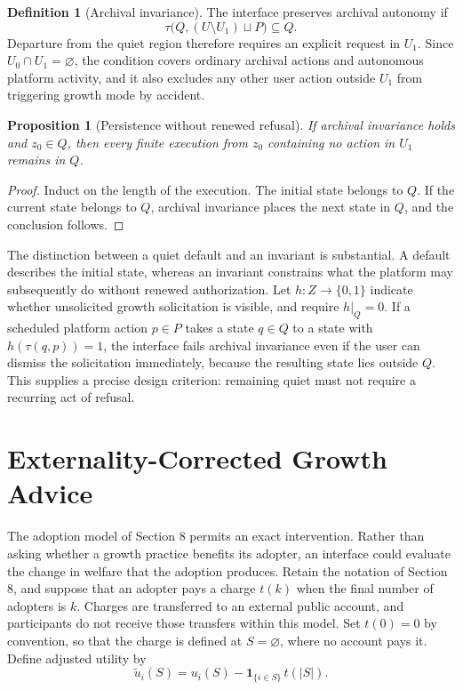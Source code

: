 \documentclass[12pt]{article}
\theoremstyle{plain}
\newtheorem{proposition}{Proposition}
\theoremstyle{definition}
\newtheorem{definition}{Definition}
\begin{document}
\begin{definition}[Archival invariance]
The interface preserves archival autonomy if
\[
\tau\bigl(Q,(U\setminus U_1)\sqcup P\bigr)\subseteq Q.
\]
Departure from the quiet region therefore requires an explicit request in $U_1$. Since $U_0\cap U_1=\varnothing$, the condition covers ordinary archival actions and autonomous platform activity, and it also excludes any other user action outside $U_1$ from triggering growth mode by accident.
\end{definition}

\begin{proposition}[Persistence without renewed refusal]
If archival invariance holds and $z_0\in Q$, then every finite execution from $z_0$ containing no action in $U_1$ remains in $Q$.
\end{proposition}

\begin{proof}
Induct on the length of the execution. The initial state belongs to $Q$. If the current state belongs to $Q$, archival invariance places the next state in $Q$, and the conclusion follows.
\end{proof}

The distinction between a quiet default and an invariant is substantial. A default describes the initial state, whereas an invariant constrains what the platform may subsequently do without renewed authorization. Let $h:Z\to\{0,1\}$ indicate whether unsolicited growth solicitation is visible, and require $h|_Q=0$. If a scheduled platform action $p\in P$ takes a state $q\in Q$ to a state with $h(\tau(q,p))=1$, the interface fails archival invariance even if the user can dismiss the solicitation immediately, because the resulting state lies outside $Q$. This supplies a precise design criterion: remaining quiet must not require a recurring act of refusal.

\section{Externality-Corrected Growth Advice}

The adoption model of Section 8 permits an exact intervention. Rather than asking whether a growth practice benefits its adopter, an interface could evaluate the change in welfare that the adoption produces. Retain the notation of Section 8, and suppose that an adopter pays a charge $t(k)$ when the final number of adopters is $k$. Charges are transferred to an external public account, and participants do not receive those transfers within this model. Set $t(0)=0$ by convention, so that the charge is defined at $S=\varnothing$, where no account pays it. Define adjusted utility by
\[
\widetilde u_i(S)=u_i(S)-\mathbf{1}_{\{i\in S\}}\,t(|S|).
\]
\end{document}
